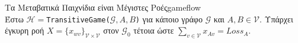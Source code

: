 {}
\begin{lemmagr}{Τα Μεταβατικά Παιχνίδια είναι Μέγιστες Ροές}{gameflow} \ \\
  Έστω $\mathcal{H} = $\texttt{\textlatin{TransitiveGame}(}$\mathcal{G}, A, B$\texttt{)} για κάποιο γράφο $\mathcal{G}$ και
  $A, B \in \mathcal{V}$. Υπάρχει έγκυρη ροή $X = \{x_{wv}\}_{\mathcal{V} \times \mathcal{V}}$ στον $\mathcal{G}_0$ τέτοια
  ώστε $\sum\limits_{v \in \mathcal{V}}x_{Av} = Loss_A$.
\end{lemmagr}

